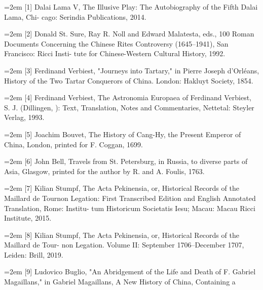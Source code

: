 \par
\noindent\hangindent=2em
[1] Dalai Lama V, The Illusive Play: The Autobiography of the Fifth Dalai Lama, Chi-%
cago: Serindia Publications, 2014.%
\par
\noindent\hangindent=2em
[2] Donald St. Sure, Ray R. Noll and Edward Malatesta, eds., 100 Roman Documents%
\space%
Concerning the Chinese Rites Controversy (1645–1941), San Francisco: Ricci Insti-%
tute for Chinese-Western Cultural History, 1992.%
\par
\noindent\hangindent=2em
[3] Ferdinand Verbiest, "Journeys into Tartary," in Pierre Joseph d'Orléans, History of%
\space%
the Two Tartar Conquerors of China. London: Hakluyt Society, 1854.%
\par
\noindent\hangindent=2em
[4] Ferdinand Verbiest, The Astronomia Europaea of Ferdinand Verbiest, S. J. (Dillingen,%
): Text, Translation, Notes and Commentaries, Nettetal: Steyler Verlag, 1993.%
\par
\noindent\hangindent=2em
[5] Joachim Bouvet, The History of Cang-Hy, the Present Emperor of China, London,%
\space%
printed for F. Coggan, 1699.%
\par
\noindent\hangindent=2em
[6] John Bell, Travels from St. Petersburg, in Russia, to diverse parts of Asia, Glasgow,%
\space%
printed for the author by R. and A. Foulis, 1763.%
\par
\noindent\hangindent=2em
[7] Kilian Stumpf, The Acta Pekinensia, or, Historical Records of the Maillard de Tournon%
\space%
Legation: First Transcribed Edition and English Annotated Translation, Rome: Institu-%
tum Historicum Societatis Iesu; Macau: Macau Ricci Institute, 2015.%
\par
\noindent\hangindent=2em
[8] Kilian Stumpf, The Acta Pekinensia, or, Historical Records of the Maillard de Tour-%
non Legation. Volume II: September 1706–December 1707, Leiden: Brill, 2019.%
\par
\noindent\hangindent=2em
[9] Ludovico Buglio, "An Abridgement of the Life and Death of F. Gabriel%
\space%
Magaillans," in Gabriel Magaillans, A New History of China, Containing a%
\space%
